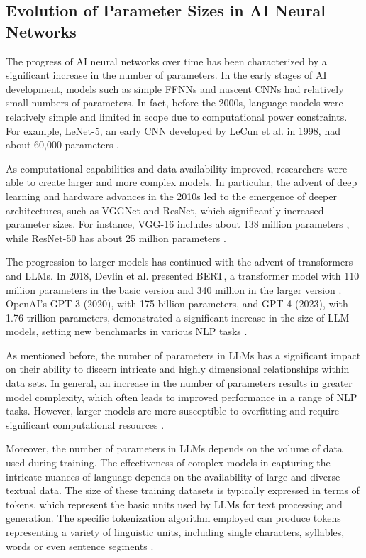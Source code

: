 \subsection{Evolution of Parameter Sizes in AI Neural Networks}

The progress of AI neural networks over time has been characterized by a significant increase in the number of parameters. In the early stages of AI development, models such as simple FFNNs and nascent CNNs had relatively small numbers of parameters. In fact, before the 2000s, language models were relatively simple and limited in scope due to computational power constraints. For example, LeNet-5, an early CNN developed by LeCun et al. in 1998, had about 60,000 parameters \cite{lecun1998gradient}. 

As computational capabilities and data availability improved, researchers were able to create larger and more complex models. In particular, the advent of deep learning and hardware advances in the 2010s led to the emergence of deeper architectures, such as VGGNet and ResNet, which significantly increased parameter sizes. For instance, VGG-16 includes about 138 million parameters \cite{simonyan2014very}, while ResNet-50 has about 25 million parameters \cite{he2016deep}.

The progression to larger models has continued with the advent of transformers and LLMs. In 2018, Devlin et al. presented BERT, a transformer model with 110 million parameters in the basic version and 340 million in the larger version \cite{devlin2018bert}. OpenAI's GPT-3 (2020), with 175 billion parameters, and GPT-4 (2023), with 1.76 trillion parameters, demonstrated a significant increase in the size of LLM models, setting new benchmarks in various NLP tasks \cite{brown2020language, achiam2023gpt}.

As mentioned before, the number of parameters in LLMs has a significant impact on their ability to discern intricate and highly dimensional relationships within data sets. In general, an increase in the number of parameters results in greater model complexity, which often leads to improved performance in a range of NLP tasks. However, larger models are more susceptible to overfitting and require significant computational resources \cite{zhao2023survey, villalobos2022machine, wei2022emergent}.

Moreover, the number of parameters in LLMs depends on the volume of data used during training. The effectiveness of complex models in capturing the intricate nuances of language depends on the availability of large and diverse textual data. The size of these training datasets is typically expressed in terms of tokens, which represent the basic units used by LLMs for text processing and generation. The specific tokenization algorithm employed can produce tokens representing a variety of linguistic units, including single characters, syllables, words or even sentence segments \cite{brown2020language}.

